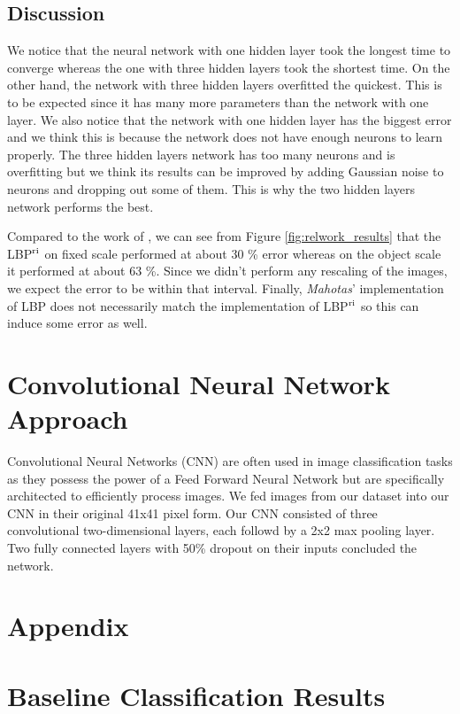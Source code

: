 \begin{multicols}{2}
\subsection{Discussion}
We notice that the neural network with one hidden layer took the longest time to converge whereas the one with three hidden layers took the shortest time. On the other hand, the network with three hidden layers overfitted the quickest. This is to be expected since it has many more parameters than the network with one layer. We also notice that the network with one hidden layer has the biggest error and we think this is because the network does not have enough neurons to learn properly. The three hidden layers network has too many neurons and is overfitting but we think its results can be improved by adding Gaussian noise to neurons and dropping out some of them. This is why the two hidden layers network performs the best. 
\par Compared to the work of \citet{kylberg2011virus}, we can see from Figure \ref{fig:relwork_results} that the LBP$^{\textnormal{ri}}$ on fixed scale performed at about 30 \% error whereas on the object scale it performed at about 63 \%. Since we didn't perform any rescaling of the images, we expect the error to be within that interval. Finally, \emph{Mahotas}' implementation of LBP does not necessarily match the implementation of LBP$^{\textnormal{ri}}$ so this can induce some error as well. 
\end{multicols}


\section{Convolutional Neural Network Approach}
Convolutional Neural Networks (CNN) are often used in image classification tasks as they possess the power of a Feed Forward Neural Network but are specifically architected to efficiently process images. We fed images from our dataset into our CNN in their original 41x41 pixel form. Our CNN consisted of three convolutional two-dimensional layers, each followd by a 2x2 max pooling layer. Two fully connected layers with 50\% dropout on their inputs concluded the network. 




\newpage
\section*{Appendix}
\appendix
\section{Baseline Classification Results}


